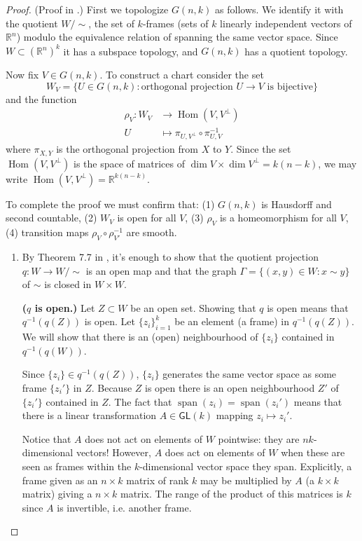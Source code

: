\begin{proof}\leavevmode
(Proof in \cite{gui2}.) First we topologize \(G(n,k)\) as follows. We identify it with the quotient \(W/ \sim\), the set of \(k\)-frames (sets of \(k\) linearly independent vectors of \(\mathbb{R}^n\)) modulo the equivalence relation of spanning the same vector space. Since \(W \subset (\mathbb{R}^n)^k\) it has a subspace topology, and \(G(n,k)\) has a quotient topology.

	Now fix \(V \in G(n,k)\). To construct a chart consider the set
	\[W_V=\{U \in G(n,k):\text{orthogonal projection \(U \to V\) is bijective} \}\]
and the function
\begin{align*}
	\rho_V: W_V &\longrightarrow \operatorname{Hom}(V,V^\perp) \\
	U &\longmapsto \pi_{U,V^\perp}\circ\pi^{-1}_{U,V}
\end{align*}
where \(\pi_{X,Y}\) is the orthogonal projection from \(X\) to \(Y\). Since the set \(\operatorname{Hom}(V,V^\perp)\) is the space of matrices of  \(\dim V \times \dim V^\perp=k (n-k)\), we may write \(\operatorname{Hom}(V,V^\perp)=\mathbb{R}^{k(n-k)}\).

To complete the proof we must confirm that: (1) \(G(n,k)\) is Hausdorff and second countable, (2) \(W_V\) is open for all  \(V\), (3) \(\rho_V\) is a homeomorphism for all \(V\), (4) transition maps \(\rho_{V}\circ \rho_{V'}^{-1}\) are smooth.
	
\begin{enumerate}
\item By Theorem 7.7 in \cite{tus}, it's enough to show that the quotient projection \(q:W \to W/\sim\) is an open map and that the graph \(\Gamma=\{(x,y) \in W:x \sim y\}\) of \(\sim\) is closed in \(W \times W\).

	\textbf{($q$ is open.)} Let \(Z \subset W\) be an open set. Showing that \(q\) is open means that \(q^{-1}(q(Z))\) is open. Let \(\{z_i\}_{i=1}^k\) be an element (a frame) in \(q^{-1}(q(Z))\). We will show that there is an (open) neighbourhood of \(\{z_i\}\) contained in \(q^{-1}(q(W))\). 

	Since \(\{z_i\}\in q^{-1}(q(Z))\), \(\{z_i\}\) generates the same vector space as some frame \(\{z_i'\}\) in \(Z\). Because \(Z\) is open there is an open neighbourhood \(Z'\) of \(\{z_i'\}\) contained in \(Z\). The fact that \(\operatorname{span}(z_i)=\operatorname{span}(z_i')\) means that there is a linear transformation \(A \in \mathsf{GL}(k)\) mapping \(z_i \mapsto z_i'\).

	Notice that \(A\) does not act on elements of  \(W\) pointwise: they are  $nk$-dimensional vectors! However, \(A\) does act on elements of \(W\) when these are seen as frames within the \(k\)-dimensional vector space they span. Explicitly, a frame given as an \(n \times k\) matrix of rank \(k\) may be multiplied by \(A\) (a \(k \times k\) matrix) giving a \(n \times k\) matrix. The range of the product of this matrices is \(k\) since \(A\) is invertible, i.e. another frame.


\end{enumerate}
\end{proof}
